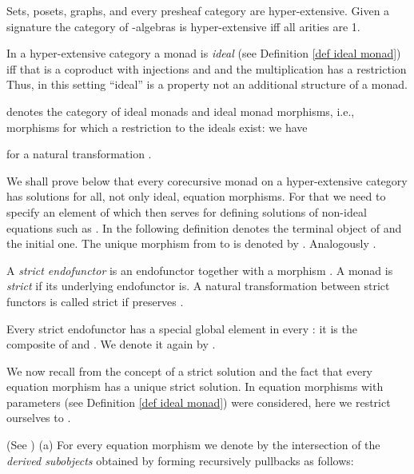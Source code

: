 \documentclass{LMCS}
\theoremstyle{plain}
\theoremstyle{definition}
\numberwithin{equation}{section}
\begin{document}
\begin{exa}
Sets, posets, graphs, and every presheaf category are hyper-extensive. Given a signature  the category of -algebras is hyper-extensive iff all arities are 1.
\end{exa}

\begin{rem}
In a hyper-extensive category a monad  is
{\it ideal} (see Definition \ref{def ideal monad}) iff that 
is a coproduct  with injections  and
 and the multiplication has a
restriction 
Thus, in this setting ``ideal'' is a property not an additional structure of a monad. 
\end{rem}

\begin{nota}
 denotes the category of ideal monads and ideal monad morphisms, i.e., morphisms  for which a restriction to the ideals exist: we have 

for a natural transformation .
\end{nota}

\begin{rem}
We shall prove below that every corecursive monad  on a hyper-extensive category has solutions for all, not only ideal, equation morphisms. For that we need to specify an element of  which then serves for defining solutions of non-ideal equations such as . In the following definition  denotes the terminal object of  and  the initial one. The unique morphism from  to  is denoted by . Analogously .
\end{rem}

\begin{defi}
A {\it strict endofunctor} is an endofunctor  together with a morphism . A monad is {\it strict} if its underlying endofunctor is. A natural transformation  between strict functors is called strict if  preserves .

Every strict endofunctor has a special global element in every : it is the composite of  and . We denote it again by .
\end{defi}

\begin{rem}
We now recall from \cite{abmv_how} the concept of a strict solution and the fact that every equation morphism has a unique strict solution. In \cite{abmv_how} equation morphisms with parameters  (see Definition \ref{def ideal monad}) were considered, here we restrict ourselves to .
\end{rem}


\begin{defi}{\rm (See \cite{abmv_how})}\label{def_derived subobjects}
(a) For every equation morphism  we denote by 
the intersection of the \emph{derived subobjects}  obtained by forming recursively pullbacks as follows:

\end{defi}
\end{document}

